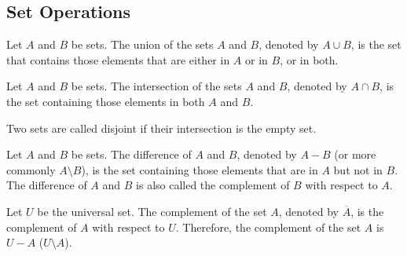 \newpage
\subsection{Set Operations}
\begin{defn}[union]
Let $A$ and $B$ be sets. The union of the sets $A$ and $B$, denoted by $A \cup B$, is the set that contains
those elements that are either in $A$ or in $B$, or in both.
\end{defn}
\begin{defn}[intersection]
Let $A$ and $B$ be sets. The intersection of the sets $A$ and $B$, denoted by $A \cap B$, is the set
containing those elements in both $A$ and $B$.
\end{defn}
\begin{defn}[disjoint]
Two sets are called disjoint if their intersection is the empty set.
\end{defn}
\begin{defn}[difference]
Let $A$ and $B$ be sets. The difference of $A$ and $B$, denoted by $A - B$ (or more commonly $A \setminus B$), is the set containing those
elements that are in $A$ but not in $B$. The difference of $A$ and $B$ is also called the complement
of $B$ with respect to $A$.
\end{defn}
\begin{defn}[compliment]
Let $U$ be the universal set. The complement of the set $A$, denoted by $\overline{A}$, is the complement
of $A$ with respect to $U$. Therefore, the complement of the set $A$ is $U - A$ ($U \setminus A$).
\end{defn}
